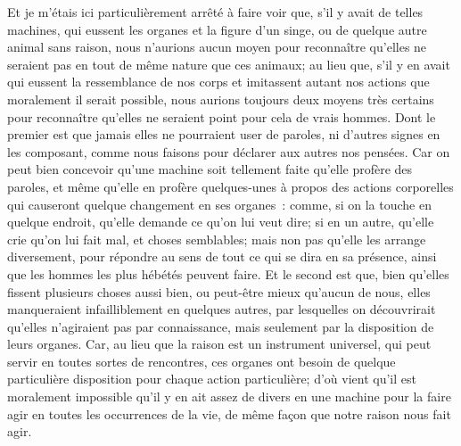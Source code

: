 \documentclass[french,twoside]{book} %
\begin{document}
Et je m'étais ici particulièrement arrêté à faire voir que, s'il y avait de telles machines, qui eussent les organes et la figure d'un singe, ou de quelque autre animal sans raison, nous n'aurions aucun moyen pour reconnaître qu'elles ne seraient pas en tout de même nature que ces animaux; au lieu que, s'il y en avait qui eussent la ressemblance de nos corps et imitassent autant nos actions que moralement il serait possible, nous aurions toujours deux moyens très certains pour reconnaître qu'elles ne seraient point pour cela de vrais hommes. Dont le premier est que jamais elles ne pourraient user de paroles, ni d'autres signes en les composant, comme nous faisons pour déclarer aux autres nos pensées. Car on peut bien concevoir qu'une machine soit tellement faite qu'elle profère des paroles, et même qu'elle en profère quelques-unes à propos des actions corporelles qui causeront quelque changement en ses organes : comme, si on la touche en quelque endroit, qu'elle demande ce qu'on lui veut dire; si en un autre, qu'elle crie qu'on lui fait mal, et choses semblables; mais non pas qu'elle les arrange diversement, pour répondre au sens de tout ce qui se dira en sa présence, ainsi que les hommes les plus hébétés peuvent faire. Et le second est que, bien qu'elles fissent plusieurs choses aussi bien, ou peut-être mieux qu'aucun de nous, elles manqueraient infailliblement en quelques autres, par lesquelles on découvrirait qu'elles n'agiraient pas par connaissance, mais seulement par la disposition de leurs organes. Car, au lieu que la raison est un instrument universel, qui peut servir en toutes sortes de rencontres, ces organes ont besoin de quelque particulière disposition pour chaque action particulière; d'où vient qu'il est moralement impossible qu'il y en ait assez de divers en une machine pour la faire agir en toutes les occurrences de la vie, de même façon que notre raison nous fait agir.\par
\end{document}
